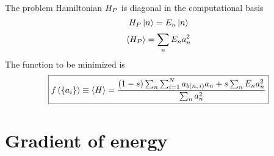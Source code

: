 The problem Hamiltonian $H_P$ is diagonal in the computational basis
\begin{equation}
  H_P \left| n \right> = E_n \left| n \right>
  \label{}
\end{equation}
\begin{equation}
  \left< H_P \right> = \sum_n E_n a_n^2
  \label{}
\end{equation}
The function to be minimized is
\begin{equation}
  \boxed{
  f \left( \left\{ a_i \right\} \right)
  \equiv \left< H \right>
  = \frac{(1-s) \sum_n \sum_{i=1}^N a_{b(n,\,i)} a_n + s \sum_n E_n a_n^2}
  {\sum_n a_n^2}
  }
  \label{}
\end{equation}
\section*{Gradient of energy}


